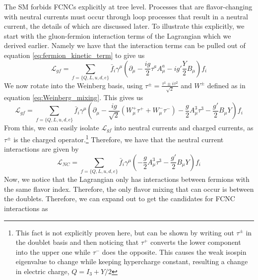 The SM forbids FCNCs explicitly at tree level. Processes that are flavor-changing with neutral currents must occur through loop processes that result in a neutral current, the details of which are discussed later. To illustrate this explicitly, we start with the gluon-fermion interaction terms of the Lagrangian which we derived earlier. Namely we have that the interaction terms can be pulled out of equation \ref{eq:fermion_kinetic_term} to give us
\begin{equation}
\mathcal{L}_{gf} = \sum_{f=\{ Q, L, u, d, e\}} \bar{f}_{i} \gamma^\mu \left(\partial_\mu - \frac{ig}{2} \tau^a A^a_\mu - ig' \frac{Y}{2} B_\mu\right)f_{i}
\end{equation}
We now rotate into the Weinberg basis, using $\tau^\pm = \frac{\tau^1 \pm i\tau^2}{\sqrt{2}}$ and $W^\pm$ defined as in equation \ref{eq:Weinberg_mixing}. This gives us
\begin{equation}
\mathcal{L}_{gf} = \sum_{f=\{ Q, L, u, d, e\}} \bar{f}_{i} \gamma^\mu \left(\partial_\mu - \frac{ig}{\sqrt{2}} (W^+_\mu\tau^+ + W_\mu^- \tau^-) -\frac{g}{2} A^3_\mu\tau^3 - \frac{g'}{2}B_\mu Y\right)f_{i}
\end{equation}
From this, we can easily isolate $\mathcal{L}_{gf}$ into neutral currents and charged currents, as $\tau^\pm$ is the charged operator.\footnote{This fact is not explicitly proven here, but can be shown by writing out $\tau^\pm$ in the doublet basis and then noticing that $\tau^+$ converts the lower component into the upper one while $\tau^-$ does the opposite. This causes the weak isospin eigenvalue to change while keeping hypercharge constant, resulting a change in electric charge, $Q = I_3 + Y/2$} Therefore, we have that the neutral current interactions are given by
\begin{equation}
\mathcal{L}_{NC} = \sum_{f=\{ Q, L, u, d, e\}} \bar{f}_{i} \gamma^\mu \left( -\frac{g}{2} A^3_\mu\tau^3 - \frac{g'}{2}B_\mu Y\right)f_{i}
\end{equation}
Now, we notice that the Lagrangian only has interactions between fermions with the same flavor index. Therefore, the only flavor mixing that can occur is between the doublets. Therefore, we can expand out to get the candidates for FCNC interactions as
